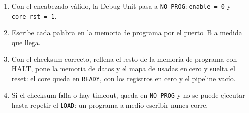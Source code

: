\begin{enumerate}[nosep]
  \item Con el encabezado válido, la Debug Unit pasa a \texttt{NO\_PROG}: \texttt{enable = 0} y
        \texttt{core\_rst = 1}.
  \item Escribe cada palabra en la memoria de programa por el puerto~B a medida que llega.
  \item Con el checksum correcto, rellena el resto de la memoria de programa con HALT, pone la
        memoria de datos y el mapa de usadas en cero y suelta el reset: el core queda en
        \texttt{READY}, con los registros en cero y el pipeline vacío.
  \item Si el checksum falla o hay timeout, queda en \texttt{NO\_PROG} y no se puede ejecutar
        hasta repetir el \texttt{LOAD}: un programa a medio escribir nunca corre.
\end{enumerate}

